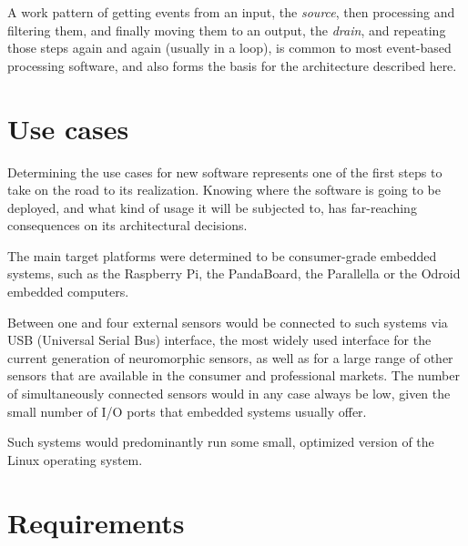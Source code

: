 \documentclass[a4paper,12pt]{report}
\begin{document}
A work pattern of getting events from an input, the \emph{source}, then processing and filtering them, and finally moving them to an output, the \emph{drain}, and repeating those steps again and again (usually in a loop), is common to most event-based processing software, and also forms the basis for the architecture described here.

\section{Use cases} \label{sec:use_cases}

Determining the use cases for new software represents one of the first steps to take on the road to its realization.
Knowing where the software is going to be deployed, and what kind of usage it will be subjected to, has far-reaching consequences on its architectural decisions.

The main target platforms were determined to be consumer-grade embedded systems, such as the Raspberry Pi, the PandaBoard, the Parallella or the Odroid embedded computers.

Between one and four external sensors would be connected to such systems via USB (Universal Serial Bus) interface, the most widely used interface for the current generation of neuromorphic sensors, as well as for a large range of other sensors that are available in the consumer and professional markets. The number of simultaneously connected sensors would in any case always be low, given the small number of I/O ports that embedded systems usually offer.

Such systems would predominantly run some small, optimized version of the Linux operating system.
\clearpage
\section{Requirements} \label{sec:requirements}
\end{document}
